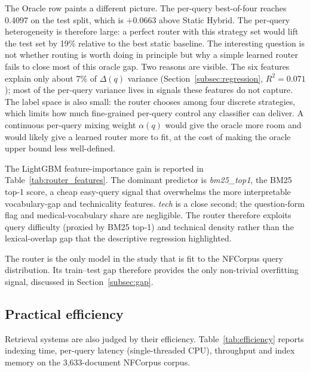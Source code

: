 \documentclass[11pt,a4paper]{article}
\begin{document}
The Oracle row paints a different picture. The per-query best-of-four
reaches 0.4097 on the test split, which is $+0.0663$ above Static
Hybrid. The per-query heterogeneity is therefore large: a perfect
router with this strategy set would lift the test set by 19\% relative
to the best static baseline. The interesting question is not whether
routing is worth doing in principle but why a simple learned router
fails to close most of this oracle gap. Two reasons are visible. The
six features explain only about 7\% of $\Delta(q)$ variance
(Section~\ref{subsec:regression}, $R^2 = 0.071$); most of the
per-query variance lives in signals these features do not capture.
The label space is also small: the router chooses among four discrete
strategies, which limits how much fine-grained per-query control any
classifier can deliver. A continuous per-query mixing weight
$\alpha(q)$ would give the oracle more room and would likely give a
learned router more to fit, at the cost of making the oracle upper
bound less well-defined.

The LightGBM feature-importance gain is reported in
Table~\ref{tab:router_features}. The dominant predictor is
\emph{bm25\_top1}, the BM25 top-1 score, a cheap easy-query signal
that overwhelms the more interpretable vocabulary-gap and technicality
features. \emph{tech} is a close second; the question-form flag and
medical-vocabulary share are negligible. The router therefore
exploits query difficulty (proxied by BM25 top-1) and technical
density rather than the lexical-overlap gap that the descriptive
regression highlighted.

\begin{table}[ht]
    \centering
    \caption{LightGBM router feature importance (gain).}
    \label{tab:router_features}
    \small
    
\end{table}

The router is the only model in the study that is fit to the NFCorpus
query distribution. Its train--test gap therefore provides the only
non-trivial overfitting signal, discussed in Section~\ref{subsec:gap}.

\subsection{Practical efficiency}
\label{subsec:efficiency}

Retrieval systems are also judged by their efficiency.
Table~\ref{tab:efficiency} reports indexing time, per-query latency
(single-threaded CPU), throughput and index memory on the
3{,}633-document NFCorpus corpus.
\end{document}
